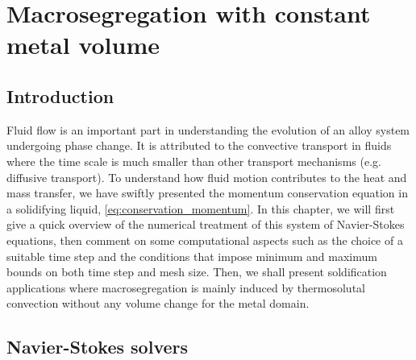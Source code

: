 \chapter{Macrosegregation with constant metal volume}
\begin{nolinkcolors} 
\minitoc
\end{nolinkcolors}
\newpage

\section{Introduction}

Fluid flow is an important part in understanding the evolution of an alloy system
undergoing phase change. It is attributed to the convective transport in fluids
where the time scale is much smaller than other transport mechanisms (e.g. diffusive transport). 
To understand how fluid motion contributes to the heat and mass transfer, we have 
swiftly presented the momentum conservation equation in a solidifying liquid, \cref{eq:conservation_momentum}.
In this chapter, we will first give a quick overview of the numerical treatment of this system of 
Navier-Stokes equations, then comment on some computational aspects such as the choice of a suitable time step and
the conditions that impose minimum and maximum bounds on both time step and mesh size. 
Then, we shall present soldification applications
where macrosegregation is mainly induced by thermosolutal convection without any volume change for the metal domain.

\section{Navier-Stokes solvers}


